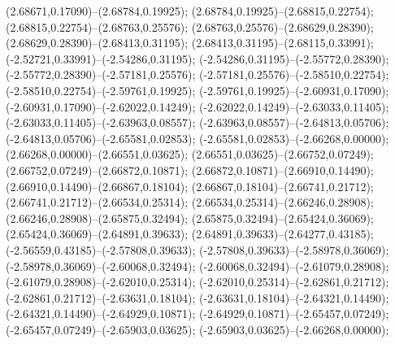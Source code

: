  (2.68671,0.17090)--(2.68784,0.19925);
 (2.68784,0.19925)--(2.68815,0.22754);
 (2.68815,0.22754)--(2.68763,0.25576);
 (2.68763,0.25576)--(2.68629,0.28390);
 (2.68629,0.28390)--(2.68413,0.31195);
 (2.68413,0.31195)--(2.68115,0.33991);
 (-2.52721,0.33991)--(-2.54286,0.31195);
 (-2.54286,0.31195)--(-2.55772,0.28390);
 (-2.55772,0.28390)--(-2.57181,0.25576);
 (-2.57181,0.25576)--(-2.58510,0.22754);
 (-2.58510,0.22754)--(-2.59761,0.19925);
 (-2.59761,0.19925)--(-2.60931,0.17090);
 (-2.60931,0.17090)--(-2.62022,0.14249);
 (-2.62022,0.14249)--(-2.63033,0.11405);
 (-2.63033,0.11405)--(-2.63963,0.08557);
 (-2.63963,0.08557)--(-2.64813,0.05706);
 (-2.64813,0.05706)--(-2.65581,0.02853);
 (-2.65581,0.02853)--(-2.66268,0.00000);
 (2.66268,0.00000)--(2.66551,0.03625);
 (2.66551,0.03625)--(2.66752,0.07249);
 (2.66752,0.07249)--(2.66872,0.10871);
 (2.66872,0.10871)--(2.66910,0.14490);
 (2.66910,0.14490)--(2.66867,0.18104);
 (2.66867,0.18104)--(2.66741,0.21712);
 (2.66741,0.21712)--(2.66534,0.25314);
 (2.66534,0.25314)--(2.66246,0.28908);
 (2.66246,0.28908)--(2.65875,0.32494);
 (2.65875,0.32494)--(2.65424,0.36069);
 (2.65424,0.36069)--(2.64891,0.39633);
 (2.64891,0.39633)--(2.64277,0.43185);
 (-2.56559,0.43185)--(-2.57808,0.39633);
 (-2.57808,0.39633)--(-2.58978,0.36069);
 (-2.58978,0.36069)--(-2.60068,0.32494);
 (-2.60068,0.32494)--(-2.61079,0.28908);
 (-2.61079,0.28908)--(-2.62010,0.25314);
 (-2.62010,0.25314)--(-2.62861,0.21712);
 (-2.62861,0.21712)--(-2.63631,0.18104);
 (-2.63631,0.18104)--(-2.64321,0.14490);
 (-2.64321,0.14490)--(-2.64929,0.10871);
 (-2.64929,0.10871)--(-2.65457,0.07249);
 (-2.65457,0.07249)--(-2.65903,0.03625);
 (-2.65903,0.03625)--(-2.66268,0.00000);
